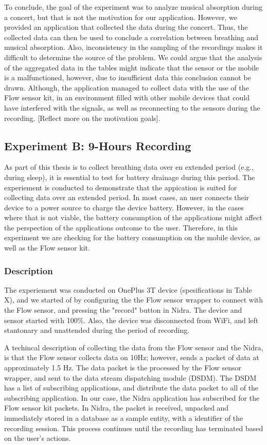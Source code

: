 To conclude, the goal of the experiment was to analyze musical absorption during a concert, but that is not the motivation for our application. However, we provided an application that collected the data during the concert. Thus, the collected data can then be used to conclude a correlation between breathing and musical absorption. Also, inconsistency in the sampling of the recordings makes it difficult to determine the source of the problem. We could argue that the analysis of the aggregated data in the tables might indicate that the sensor or the mobile is a malfunctioned, however, due to insufficient data this conclusion cannot be drawn. Although, the application managed to collect data with the use of the Flow sensor kit, in an environment filled with other mobile devices that could have interfered with the signals, as well as reconnecting to the sensors during the recording. [Reflect more on the motivation goals].

\subsection{Experiment B: 9-Hours Recording}
As part of this thesis is to collect breathing data over en extended period (e.g., during sleep), it is essential to test for battery drainage during this period. The experiement is conducted to demonstrate that the appication is suited for collecting data over an extended period. In most cases, an user connects their device to a power source to charge the device battery. However, in the cases where that is not viable, the battery consumption of the applications might affect the perspection of the applications outcome to the user. Therefore, in this experiment we are checking for the battery consumption on the mobile device, as well as the Flow sensor kit. 

\subsubsection{Description}
The experiement was conducted on OnePlus 3T device (spesifications in Table X), and we started of by configuring the the Flow sensor wrapper to connect with the Flow sensor, and pressing the "record" button in Nidra. The device and sensor started with 100\%. Also, the device was disconnected from WiFi, and left stantonary and unattended during the period of recording.  

A techincal description of collecting the data from the Flow sensor and the Nidra, is that the Flow sensor collects data on 10Hz; however, sends a packet of data at approximately 1.5 Hz. The data packet is the processed by the Flow sensor wrapper, and sent to the data stream dispatching module (DSDM). The DSDM has a list of subscribing applications, and distribute the data packet to all of the subscribing application. In our case, the Nidra application has subscribed for the Flow sensor kit packets. In Nidra, the packet is received, unpacked and immediately stored in a database as a sample entity, with a identifier of the recording session. This process continues until the recording has terminated based on the user's actions.

